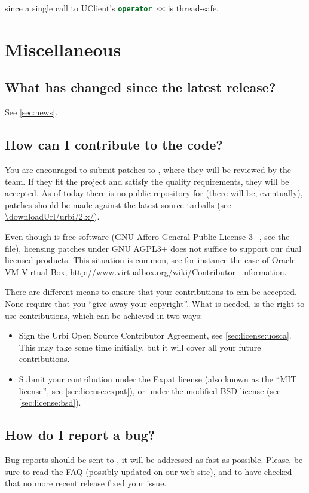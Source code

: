 \noindent
since a single call to UClient's \lstinline[language=C++]|operator <<|
is thread-safe.


\section{Miscellaneous}
\subsection{What has changed since the latest release?}
See \autoref{sec:news}.

\subsection{How can I contribute to the code?}
\label{sec:faq:contribute}
You are encouraged to submit patches to ,
where they will be reviewed by the \urbi team.  If they fit the project and
satisfy the quality requirements, they will be accepted.  As of today there
is no public repository for \usdk (there will be, eventually), patches
should be made against the latest source tarballs (see
\url{\downloadUrl/urbi/2.x/}).

Even though \usdk is free software (GNU Affero General Public License 3+,
see the  file), licensing patches under GNU AGPL3+ does
not suffice to support our dual licensed products.  This situation is
common, see for instance the case of Oracle VM Virtual Box,
\url{http://www.virtualbox.org/wiki/Contributor_information}.

There are different means to ensure that your contributions to \usdk can be
accepted.  None require that you ``give away your copyright''.  What is
needed, is the right to use contributions, which can be achieved in two
ways:
\begin{itemize}
\item Sign the Urbi Open Source Contributor Agreement, see
  \autoref{sec:license:uosca}.  This may take some time initially, but it
  will cover all your future contributions.
\item Submit your contribution under the Expat license (also known as the
  ``MIT license'', see \autoref{sec:license:expat}), or under the modified
  BSD license (see \autoref{sec:license:bsd}).
\end{itemize}



\subsection{How do I report a bug?}
\label{sec:bug}
Bug reports should be sent to , it will
be addressed as fast as possible.  Please, be sure to read the FAQ (possibly
updated on our web site), and to have checked that no more recent release
fixed your issue.


